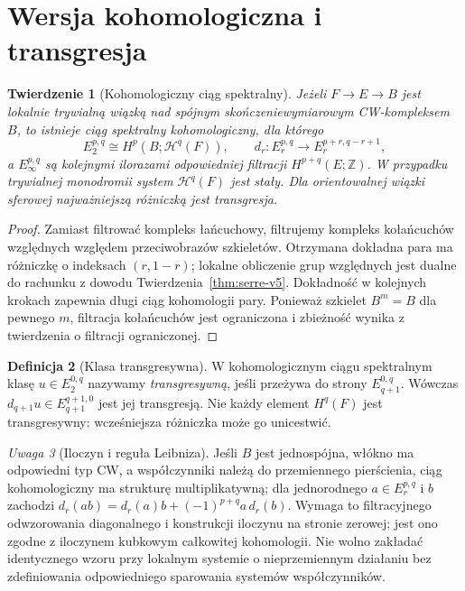 \documentclass[11pt,a4paper,oneside]{report}
\newcommand{\Z}{\mathbb{Z}}
\theoremstyle{plain}
\newtheorem{twierdzenie}{Twierdzenie}[section]
\theoremstyle{definition}
\newtheorem{definicja}[twierdzenie]{Definicja}
\theoremstyle{remark}
\newtheorem{uwaga}[twierdzenie]{Uwaga}
\begin{document}
\section{Wersja kohomologiczna i transgresja}
\begin{twierdzenie}[Kohomologiczny ciąg spektralny]
Jeżeli $F\to E\to B$ jest lokalnie trywialną wiązką
nad spójnym skończeniewymiarowym CW-kompleksem $B$, to istnieje ciąg spektralny
kohomologiczny, dla którego
\[
E_2^{p,q}\cong H^p(B;\mathcal H^q(F)),\qquad
 d_r:E_r^{p,q}\longrightarrow E_r^{p+r,q-r+1},
\]
a $E_\infty^{p,q}$ są kolejnymi ilorazami odpowiedniej
filtracji $H^{p+q}(E;\Z)$. W przypadku trywialnej monodromii
system $\mathcal H^q(F)$ jest stały. Dla orientowalnej
wiązki sferowej najważniejszą różniczką jest transgresja.
\end{twierdzenie}
\begin{proof}
Zamiast filtrować kompleks łańcuchowy, filtrujemy kompleks
kołańcuchów względnych względem przeciwobrazów szkieletów.
Otrzymana dokładna para ma różniczkę o indeksach
$(r,1-r)$; lokalne obliczenie grup względnych jest dualne do
rachunku z dowodu Twierdzenia~\ref{thm:serre-v5}.
Dokładność w kolejnych krokach zapewnia długi ciąg
kohomologii pary. Ponieważ szkielet $B^m=B$ dla pewnego $m$, filtracja
kołańcuchów jest ograniczona i zbieżność wynika z
twierdzenia o filtracji ograniczonej.
\end{proof}
\begin{definicja}[Klasa transgresywna]
W kohomologicznym ciągu spektralnym klasę
$u\in E_2^{0,q}$ nazywamy \emph{transgresywną}, jeśli
przeżywa do strony $E_{q+1}^{0,q}$. Wówczas
$d_{q+1}u\in E_{q+1}^{q+1,0}$ jest jej transgresją.
Nie każdy element $H^q(F)$ jest transgresywny:
wcześniejsza różniczka może go unicestwić.
\end{definicja}
\begin{uwaga}[Iloczyn i reguła Leibniza]
Jeśli $B$ jest jednospójna, włókno ma odpowiedni typ CW,
a współczynniki należą do przemiennego pierścienia,
ciąg kohomologiczny ma strukturę multiplikatywną;
dla jednorodnego $a\in E_r^{p,q}$ i $b$ zachodzi
$d_r(ab)=d_r(a)b+(-1)^{p+q}a\,d_r(b)$.
Wymaga to filtracyjnego odwzorowania diagonalnego
i konstrukcji iloczynu na stronie zerowej; jest ono zgodne
z iloczynem kubkowym całkowitej kohomologii. Nie wolno
zakładać identycznego wzoru przy lokalnym systemie o
nieprzemiennym działaniu bez zdefiniowania odpowiedniego
sparowania systemów współczynników.
\end{uwaga}
\end{document}
